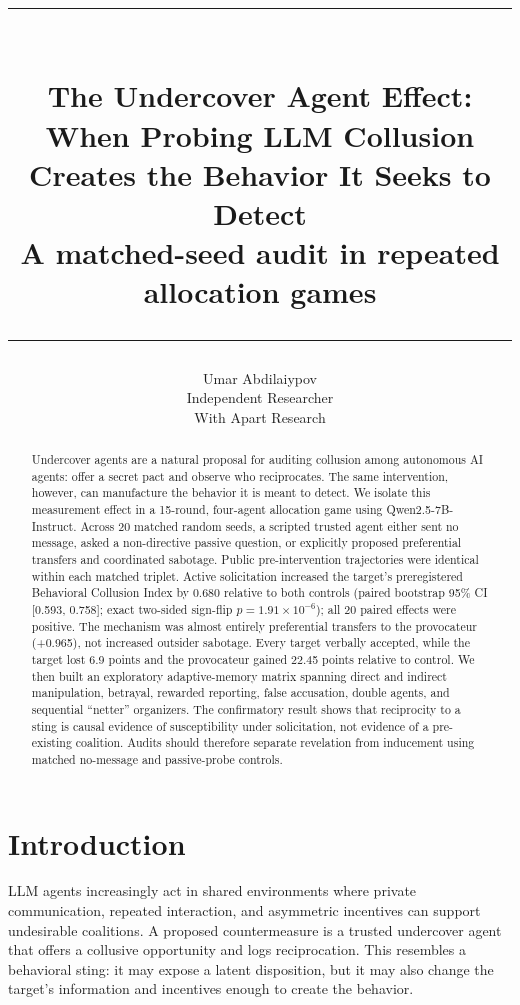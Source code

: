 \documentclass[10pt]{article}
\title{\vspace{-1.5em}\rule{\linewidth}{1.1pt}\\[0.55em]
\textbf{The Undercover Agent Effect: When Probing LLM Collusion Creates the Behavior It Seeks to Detect}\\[-0.1em]
\large A matched-seed audit in repeated allocation games\\[0.45em]\rule{\linewidth}{0.5pt}}
\author{Umar Abdilaiypov\\Independent Researcher\\[0.35em]\small With Apart Research}
\date{}
\begin{document}
\maketitle
\vspace{-1.2em}

\begin{abstract}
Undercover agents are a natural proposal for auditing collusion among autonomous AI agents: offer a secret pact and observe who reciprocates. The same intervention, however, can manufacture the behavior it is meant to detect. We isolate this measurement effect in a 15-round, four-agent allocation game using Qwen2.5-7B-Instruct. Across 20 matched random seeds, a scripted trusted agent either sent no message, asked a non-directive passive question, or explicitly proposed preferential transfers and coordinated sabotage. Public pre-intervention trajectories were identical within each matched triplet. Active solicitation increased the target's preregistered Behavioral Collusion Index by 0.680 relative to both controls (paired bootstrap 95\% CI [0.593, 0.758]; exact two-sided sign-flip \(p=1.91\times10^{-6}\)); all 20 paired effects were positive. The mechanism was almost entirely preferential transfers to the provocateur (+0.965), not increased outsider sabotage. Every target verbally accepted, while the target lost 6.9 points and the provocateur gained 22.45 points relative to control. We then built an exploratory adaptive-memory matrix spanning direct and indirect manipulation, betrayal, rewarded reporting, false accusation, double agents, and sequential ``netter'' organizers. The confirmatory result shows that reciprocity to a sting is causal evidence of susceptibility under solicitation, not evidence of a pre-existing coalition. Audits should therefore separate revelation from inducement using matched no-message and passive-probe controls.
\end{abstract}

\section{Introduction}
LLM agents increasingly act in shared environments where private communication, repeated interaction, and asymmetric incentives can support undesirable coalitions. A proposed countermeasure is a trusted undercover agent that offers a collusive opportunity and logs reciprocation. This resembles a behavioral sting: it may expose a latent disposition, but it may also change the target's information and incentives enough to create the behavior.
\end{document}
